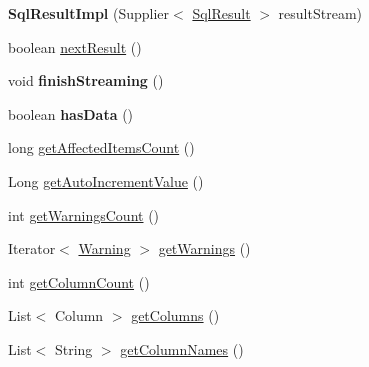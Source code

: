\begin{DoxyCompactItemize}
\item 
\mbox{\label{classcom_1_1mysql_1_1cj_1_1xdevapi_1_1_sql_result_impl_a47ac7870d2b188ad61ff85f493aa740b}} 
{\bfseries Sql\+Result\+Impl} (Supplier$<$ \mbox{\hyperlink{interfacecom_1_1mysql_1_1cj_1_1xdevapi_1_1_sql_result}{Sql\+Result}} $>$ result\+Stream)
\item 
boolean \mbox{\hyperlink{classcom_1_1mysql_1_1cj_1_1xdevapi_1_1_sql_result_impl_a63d1fa4f9bdb44615cb07d3324e96341}{next\+Result}} ()
\item 
\mbox{\label{classcom_1_1mysql_1_1cj_1_1xdevapi_1_1_sql_result_impl_a9ace870266358e357a46f584b3545dc6}} 
void {\bfseries finish\+Streaming} ()
\item 
\mbox{\label{classcom_1_1mysql_1_1cj_1_1xdevapi_1_1_sql_result_impl_afc10544f4b662a846d92d2889cd20335}} 
boolean {\bfseries has\+Data} ()
\item 
long \mbox{\hyperlink{classcom_1_1mysql_1_1cj_1_1xdevapi_1_1_sql_result_impl_a4fe6c0a9ccb9785f48c25bbeebec10e2}{get\+Affected\+Items\+Count}} ()
\item 
Long \mbox{\hyperlink{classcom_1_1mysql_1_1cj_1_1xdevapi_1_1_sql_result_impl_ac1730d1c9d94a55bd5519e803be617e4}{get\+Auto\+Increment\+Value}} ()
\item 
int \mbox{\hyperlink{classcom_1_1mysql_1_1cj_1_1xdevapi_1_1_sql_result_impl_aec69633fd00fa0b998014ea8f94cc797}{get\+Warnings\+Count}} ()
\item 
Iterator$<$ \mbox{\hyperlink{interfacecom_1_1mysql_1_1cj_1_1protocol_1_1_warning}{Warning}} $>$ \mbox{\hyperlink{classcom_1_1mysql_1_1cj_1_1xdevapi_1_1_sql_result_impl_a58d7c6a9ad8d87b5447c2d2f5849ee73}{get\+Warnings}} ()
\item 
int \mbox{\hyperlink{classcom_1_1mysql_1_1cj_1_1xdevapi_1_1_sql_result_impl_a79fa6d1b15f715dc2d451ed8ec22493f}{get\+Column\+Count}} ()
\item 
List$<$ Column $>$ \mbox{\hyperlink{classcom_1_1mysql_1_1cj_1_1xdevapi_1_1_sql_result_impl_a284f0953dcca6644eb9eff7749e32f9b}{get\+Columns}} ()
\item 
List$<$ String $>$ \mbox{\hyperlink{classcom_1_1mysql_1_1cj_1_1xdevapi_1_1_sql_result_impl_a9f539396fee9a85bbebbb39d803c9eea}{get\+Column\+Names}} ()

\end{DoxyCompactItemize}
